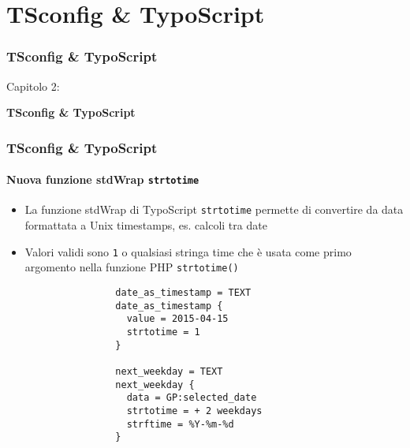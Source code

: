 %

\section{TSconfig \& TypoScript}
\begin{frame}[fragile]
	\frametitle{TSconfig \& TypoScript}

	\begin{center}\huge{Capitolo 2:}\end{center}
	\begin{center}\huge{\color{typo3darkgrey}\textbf{TSconfig \& TypoScript}}\end{center}

\end{frame}

\begin{frame}[fragile]
	\frametitle{TSconfig \& TypoScript}
	\framesubtitle{Nuova funzione stdWrap \texttt{strtotime}}

	\begin{itemize}

		\item La funzione stdWrap di TypoScript \texttt{strtotime} permette di convertire da
			data formattata a Unix timestamps, es. calcoli tra date

		\item Valori validi sono \texttt{1} o qualsiasi stringa time che è usata come primo
			argomento nella funzione PHP \texttt{strtotime()}

			\begin{lstlisting}
				date_as_timestamp = TEXT
				date_as_timestamp {
				  value = 2015-04-15
				  strtotime = 1
				} 

				next_weekday = TEXT
				next_weekday {
				  data = GP:selected_date
				  strtotime = + 2 weekdays
				  strftime = %Y-%m-%d
				}
			\end{lstlisting}

	\end{itemize}

\end{frame}

